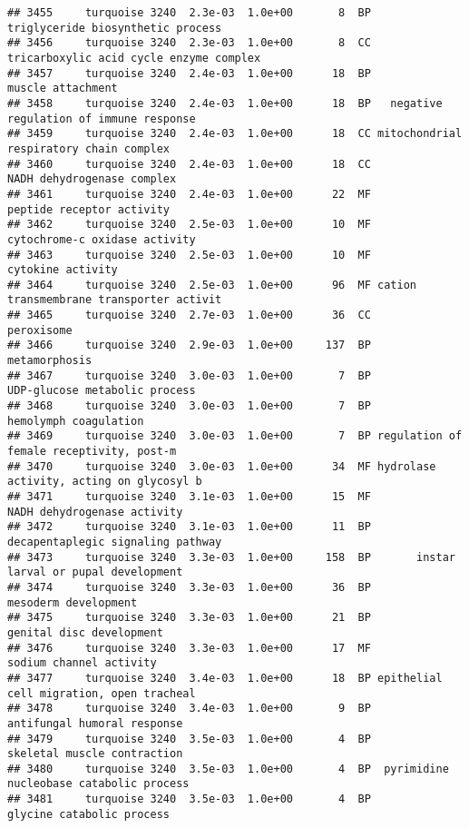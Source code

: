 \documentclass[]{article}
\begin{document}
\begin{verbatim}
## 3455     turquoise 3240  2.3e-03  1.0e+00       8  BP        triglyceride biosynthetic process
## 3456     turquoise 3240  2.3e-03  1.0e+00       8  CC  tricarboxylic acid cycle enzyme complex
## 3457     turquoise 3240  2.4e-03  1.0e+00      18  BP                        muscle attachment
## 3458     turquoise 3240  2.4e-03  1.0e+00      18  BP   negative regulation of immune response
## 3459     turquoise 3240  2.4e-03  1.0e+00      18  CC mitochondrial respiratory chain complex 
## 3460     turquoise 3240  2.4e-03  1.0e+00      18  CC               NADH dehydrogenase complex
## 3461     turquoise 3240  2.4e-03  1.0e+00      22  MF                peptide receptor activity
## 3462     turquoise 3240  2.5e-03  1.0e+00      10  MF            cytochrome-c oxidase activity
## 3463     turquoise 3240  2.5e-03  1.0e+00      10  MF                        cytokine activity
## 3464     turquoise 3240  2.5e-03  1.0e+00      96  MF cation transmembrane transporter activit
## 3465     turquoise 3240  2.7e-03  1.0e+00      36  CC                               peroxisome
## 3466     turquoise 3240  2.9e-03  1.0e+00     137  BP                            metamorphosis
## 3467     turquoise 3240  3.0e-03  1.0e+00       7  BP            UDP-glucose metabolic process
## 3468     turquoise 3240  3.0e-03  1.0e+00       7  BP                    hemolymph coagulation
## 3469     turquoise 3240  3.0e-03  1.0e+00       7  BP regulation of female receptivity, post-m
## 3470     turquoise 3240  3.0e-03  1.0e+00      34  MF hydrolase activity, acting on glycosyl b
## 3471     turquoise 3240  3.1e-03  1.0e+00      15  MF              NADH dehydrogenase activity
## 3472     turquoise 3240  3.1e-03  1.0e+00      11  BP        decapentaplegic signaling pathway
## 3473     turquoise 3240  3.3e-03  1.0e+00     158  BP       instar larval or pupal development
## 3474     turquoise 3240  3.3e-03  1.0e+00      36  BP                     mesoderm development
## 3475     turquoise 3240  3.3e-03  1.0e+00      21  BP                 genital disc development
## 3476     turquoise 3240  3.3e-03  1.0e+00      17  MF                  sodium channel activity
## 3477     turquoise 3240  3.4e-03  1.0e+00      18  BP epithelial cell migration, open tracheal
## 3478     turquoise 3240  3.4e-03  1.0e+00       9  BP              antifungal humoral response
## 3479     turquoise 3240  3.5e-03  1.0e+00       4  BP              skeletal muscle contraction
## 3480     turquoise 3240  3.5e-03  1.0e+00       4  BP  pyrimidine nucleobase catabolic process
## 3481     turquoise 3240  3.5e-03  1.0e+00       4  BP                glycine catabolic process

\end{verbatim}
\end{document}
